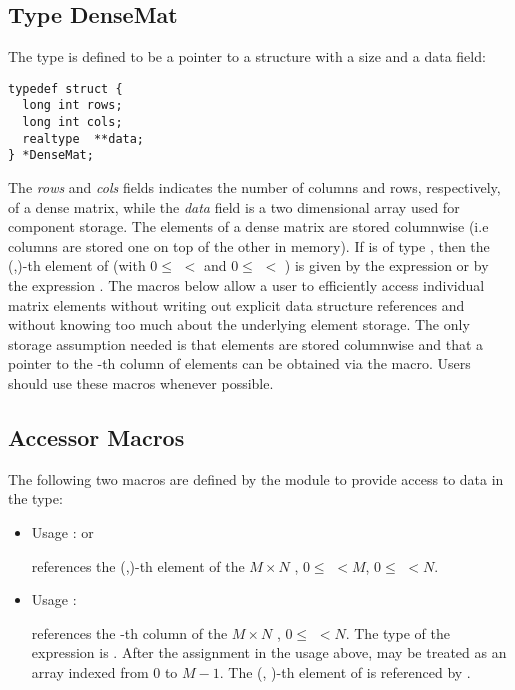 \subsection{Type DenseMat}
The type  is defined to be a pointer to a structure    
with a size and a data field:
\begin{verbatim}
typedef struct {
  long int rows;
  long int cols;
  realtype  **data;
} *DenseMat;
\end{verbatim}
The {\em rows} and {\em cols} fields indicates the number of columns and rows,
respectively, of a dense matrix, while the {\em data} field is a two 
dimensional array used for component storage. 
The elements of a dense matrix are stored columnwise (i.e columns are stored 
one on top of the other in memory). If  is of type , 
then the (,)-th element of  
(with $0 \le$  $<$  and $ 0 \le$  $<$ ) 
is given by the expression  
or by the expression . The macros below     
allow a user to efficiently access individual matrix           
elements without writing out explicit data structure           
references and without knowing too much about the underlying   
element storage. The only storage assumption needed is that    
elements are stored columnwise and that a pointer to the -th   
column of elements can be obtained via the  macro.    
Users should use these macros whenever possible.               

\subsection{Accessor Macros}
The following two macros are defined by the {\dense} module to provide
access to data in the  type:
\begin{itemize}
\item {}
  \par Usage :  or
  \par {} references the (,)-th element of the $M \times N$
   , $0 \le$  $< M$, $0 \le$  $< N$.
  
\item {}
  \par Usage : 
  \par {} references the -th column of the $M \times N$
   , $0 \le$  $< N$. The type of the expression          
   is  . After the assignment in the usage    
  above,  may be treated as an array indexed from $0$ to $M-1$. 
  The (, )-th element of  is referenced by .  
\end{itemize}

